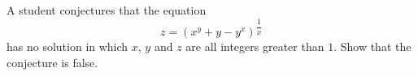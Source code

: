 A student conjectures that the equation
\[z=\left(x^y+y-y^x\right)^{\dfrac1x}\]
has no solution in which $x$, $y$ and $z$ are all integers greater than $1$. Show that the conjecture is false.
